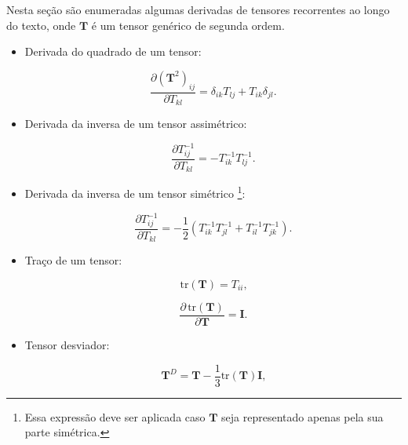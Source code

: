 \documentclass[_ArquivoPrincipal.tex]{subfiles}
\begin{document}
Nesta seção são enumeradas algumas derivadas de tensores recorrentes ao longo do texto, onde $\mathbf{T}$ é um tensor genérico de segunda ordem.
\begin{itemize}[leftmargin=\parindent,labelwidth=\parindent,labelsep=0.3cm]
	\item Derivada do quadrado de um tensor:
	
	\begin{equation}
	\dfrac{\partial (\mathbf{T}^2)_{ij}}{\partial {T}_{kl}}=\delta_{ik}{T}_{lj}+{T}_{ik}\delta_{jl} \text{.} \label{eq:dT2}
	\end{equation}
	
	\item Derivada da inversa de um tensor assimétrico:
	
	\begin{equation}\label{eq:dinv}
	\dfrac{\partial {T}^{-1}_{ij}}{\partial {T}_{kl}} = -{T}^{-1}_{ik}{T}^{-1}_{lj} \text{.}%
	\end{equation}
	
	\item Derivada da inversa de um tensor simétrico \footnote{Essa expressão deve ser aplicada caso $\mathbf{T}$ seja representado apenas pela sua parte simétrica.}:
	
	\begin{equation}\label{eq:dinvsim}
	\dfrac{\partial {T}^{-1}_{ij}}{\partial {T}_{kl}} = -\dfrac{1}{2}\left({T}^{-1}_{ik}{T}^{-1}_{jl} + {T}^{-1}_{il}{T}^{-1}_{jk}\right) \text{.}%
	\end{equation}
	
	
	\item Traço de um tensor:
	
	\begin{equation}
	\text{tr}(\mathbf{T})={T}_{ii} \text{,}
	\end{equation}
	
	\begin{equation}
	\dfrac{\partial\, \text{tr}(\mathbf{T})}{\partial \mathbf{T}}=\mathbf{I} \text{.} \label{eq:dtraco}
	\end{equation}
	
	\item Tensor desviador:
	
	\begin{equation}
	\mathbf{T}^D = \mathbf{T} - \dfrac{1}{3}\text{tr}(\mathbf{T})\mathbf{I} \text{,} \label{eq:dev}
	\end{equation}
	

\end{itemize}
\end{document}
